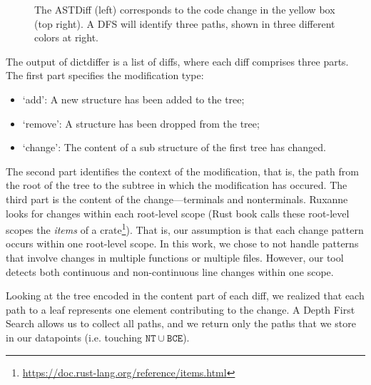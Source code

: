 \begin{figure}[h]
    
    \caption{\label{fig:extraction}The ASTDiff (left) corresponds to the code change in the yellow box (top right). A DFS will identify three paths, shown in three different colors at right.}

\end{figure}


The output of dictdiffer is a list of diffs, where each diff comprises three parts. The first part specifies the modification type:

\begin{itemize}
    \item `add': A new structure has been added to the tree; 
    \item `remove': A structure has been dropped from the tree; 
    \item `change': The content of a sub structure of the first tree has changed.
\end{itemize}

The second part identifies the context of the modification, that is, the path from the root of the tree to the subtree in which the modification has occured. The third part is the content of the change---terminals and nonterminals. Ruxanne looks for changes within each root-level scope (Rust book calls these root-level scopes the \textit{items} of a crate\footnote{\url{https://doc.rust-lang.org/reference/items.html}}). That is, our assumption is that each change pattern occurs within one root-level scope. In this work, we chose to not handle patterns that involve changes in multiple functions or multiple files. However, our tool detects both continuous and non-continuous line changes within one scope.

Looking at the tree encoded in the content part of each diff, we realized that each path to a leaf represents one element contributing to the change. A Depth First Search allows us to collect all paths, and we return only the paths that we store in our datapoints (i.e. touching $\mathtt{NT} \cup \mathtt{BCE}$).

